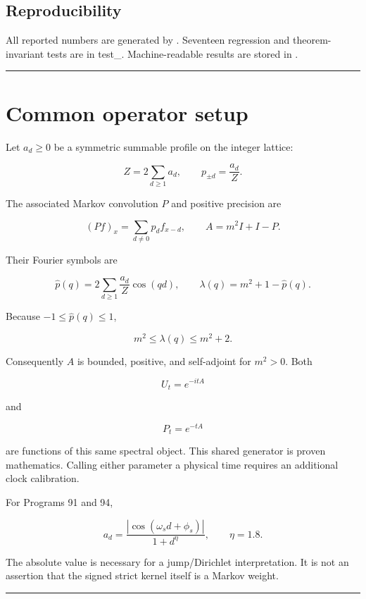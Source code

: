\documentclass[11pt,a4paper,openany]{report}
\begin{document}
\section{Reproducibility}

All reported numbers are generated by . Seventeen regression and theorem-invariant tests are in test\_. Machine-readable results are stored in .

\par\medskip\hrule\medskip

\chapter{Common operator setup}

Let \(a_d\ge0\) be a symmetric summable profile on the integer lattice:

\[
Z=2\sum_{d\ge1}a_d,
\qquad
p_{\pm d}=\frac{a_d}{Z}.
\]

The associated Markov convolution \(P\) and positive precision are

\[
(Pf)_x=\sum_{d\ne0}p_d f_{x-d},
\qquad
A=m^2I+I-P.
\]

Their Fourier symbols are

\[
\widehat p(q)=2\sum_{d\ge1}\frac{a_d}{Z}\cos(qd),
\qquad
\lambda(q)=m^2+1-\widehat p(q).
\]

Because \(-1\le\widehat p(q)\le1\),

\[
m^2\le\lambda(q)\le m^2+2.
\]

Consequently \(A\) is bounded, positive, and self-adjoint for \(m^2>0\). Both

\[
U_t=e^{-itA}
\]

and

\[
P_t=e^{-tA}
\]

are functions of this same spectral object. This shared generator is proven mathematics. Calling either parameter a physical time requires an additional clock calibration.

For Programs 91 and 94,

\[
a_d
=
\frac{|\cos(\omega_sd+\phi_s)|}{1+d^\eta},
\qquad
\eta=1.8.
\]

The absolute value is necessary for a jump/\allowbreak{}Dirichlet interpretation. It is not an assertion that the signed strict kernel itself is a Markov weight.

\par\medskip\hrule\medskip
\end{document}
